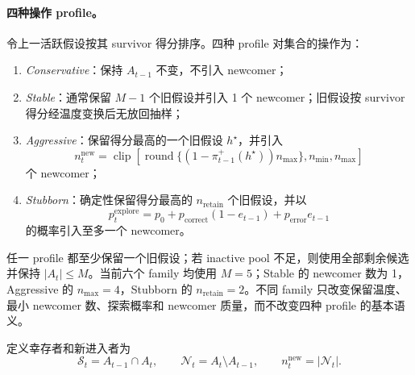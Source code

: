 \paragraph{四种操作 profile。}
令上一活跃假设按其 survivor 得分排序。四种 profile 对集合的操作为：
\begin{enumerate}
    \item \textit{Conservative}：保持 $A_{t-1}$ 不变，不引入 newcomer；
    \item \textit{Stable}：通常保留 $M-1$ 个旧假设并引入 1 个 newcomer；旧假设按 survivor 得分经温度变换后无放回抽样；
    \item \textit{Aggressive}：保留得分最高的一个旧假设 $h^\star$，并引入
    \begin{equation}
        n_t^{\mathrm{new}}
        =
        \operatorname{clip}
        \left[
            \operatorname{round}
            \{(1-\pi_{t-1}^+(h^\star))n_{\max}\},
            n_{\min},n_{\max}
        \right]
        \label{eq:modelv2-aggressive-count}
    \end{equation}
    个 newcomer；
    \item \textit{Stubborn}：确定性保留得分最高的 $n_{\mathrm{retain}}$ 个旧假设，并以
    \begin{equation}
        p_t^{\mathrm{explore}}
        =
        p_0+p_{\mathrm{correct}}(1-e_{t-1})
        +p_{\mathrm{error}}e_{t-1}
        \label{eq:modelv2-stubborn-explore}
    \end{equation}
    的概率引入至多一个 newcomer。
\end{enumerate}
任一 profile 都至少保留一个旧假设；若 inactive pool 不足，则使用全部剩余候选并保持 $|A_t|\leq M$。当前六个 family 均使用 $M=5$；Stable 的 newcomer 数为 1，Aggressive 的 $n_{\max}=4$，Stubborn 的 $n_{\mathrm{retain}}=2$。不同 family 只改变保留温度、最小 newcomer 数、探索概率和 newcomer 质量，而不改变四种 profile 的基本语义。

定义幸存者和新进入者为
\begin{equation}
    \mathcal S_t=A_{t-1}\cap A_t,
    \qquad
    \mathcal N_t=A_t\setminus A_{t-1},
    \qquad
    n_t^{\mathrm{new}}=|\mathcal N_t|.
    \label{eq:modelv2-survivor-newcomer}
\end{equation}

